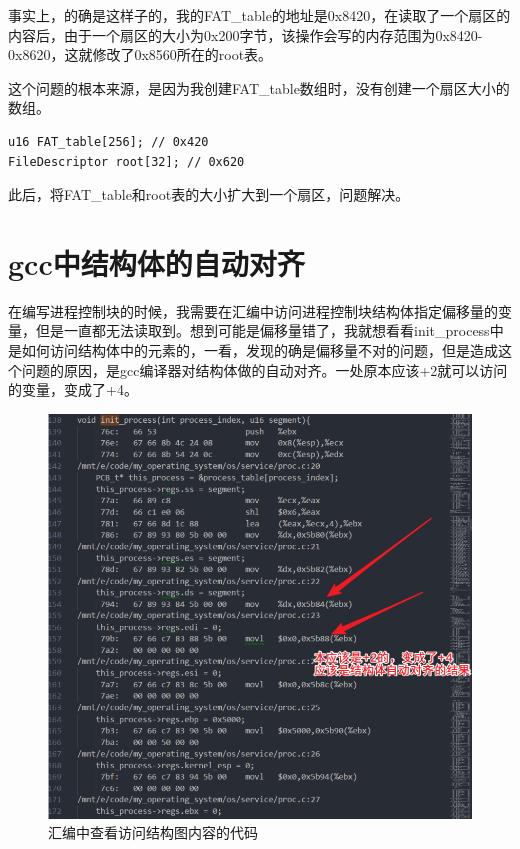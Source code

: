 \documentclass[forprint]{WHUBachelor}
\begin{document}
事实上，的确是这样子的，我的FAT\_table的地址是0x8420，在读取了一个扇区的内容后，由于一个扇区的大小为0x200字节，该操作会写的内存范围为0x8420-0x8620，这就修改了0x8560所在的root表。

这个问题的根本来源，是因为我创建FAT\_table数组时，没有创建一个扇区大小的数组。

\begin{lstlisting}[language={[x86masm]Assembler}]
u16 FAT_table[256]; // 0x420
FileDescriptor root[32]; // 0x620
\end{lstlisting}

此后，将FAT\_table和root表的大小扩大到一个扇区，问题解决。

\section{gcc中结构体的自动对齐}

在编写进程控制块的时候，我需要在汇编中访问进程控制块结构体指定偏移量的变量，但是一直都无法读取到。想到可能是偏移量错了，我就想看看init\_process中是如何访问结构体中的元素的，一看，发现的确是偏移量不对的问题，但是造成这个问题的原因，是gcc编译器对结构体做的自动对齐。一处原本应该+2就可以访问的变量，变成了+4。

\begin{figure}[htp]
  \centering
  \includegraphics[width=13cm]{"./figure/2018-04-17-10-37-48.png"}
  \caption{汇编中查看访问结构图内容的代码}
  \label{fig:}
\end{figure}
\end{document}
